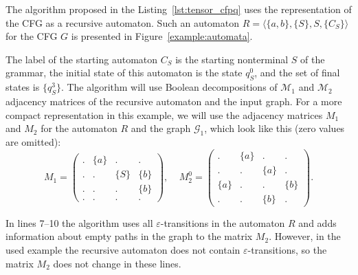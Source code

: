 The algorithm proposed in the Listing~\ref{lst:tensor_cfpq} uses the representation of the CFG as a recursive automaton. Such an automaton $R = \langle \{a, b\}, \{S\}, S, \{C_S\}\rangle$ for the CFG $G$ is presented in Figure~\ref{example:automata}.

The label of the starting automaton $C_S$ is the starting nonterminal $S$ of the grammar, the initial state of this automaton is the state $q_S^0$, and the set of final states is $\{ q_S^3 \}$. The algorithm will use Boolean decompositions of $\mathcal{M}_1$ and $\mathcal{M}_2$ adjacency matrices of the recursive automaton and the input graph. For a more compact representation in this example, we will use the adjacency matrices $M_1$ and $M_2$ for the automaton $R$ and the graph $\mathcal{G}_1$, which look like this (zero values are omitted):
    $$
    M_1 =
    \begin{pmatrix}
    . & \{a\} & . & .     \\
    . & . & \{S\} & \{b\} \\
    . & . & . & \{b\}     \\
    . & . & . & .
    \end{pmatrix}
    ,~~~~~
    M_2^0 =
    \begin{pmatrix}
    . & \{a\} & . & .     \\
    . & . & \{a\} & .     \\
    \{a\} & . & . & \{b\} \\
    . & . & \{b\} & .
    \end{pmatrix}.
    $$ 

In lines 7--10 the algorithm uses all $\varepsilon$-transitions in the automaton $R$ and adds information about empty paths in the graph to the matrix $M_2$. However, in the used example the recursive automaton does not contain $\varepsilon$-transitions, so the matrix $M_2$ does not change in these lines.

